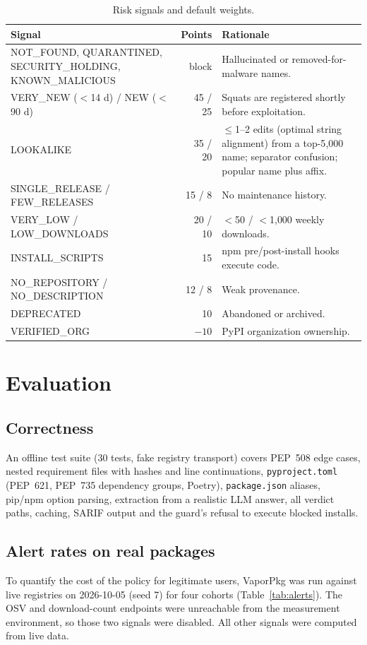 \documentclass[11pt,a4paper]{article}
\begin{document}
\begin{table}[h]
\centering\small
\begin{tabularx}{\linewidth}{@{}>{\raggedright\arraybackslash}p{5.6cm} r >{\raggedright\arraybackslash}X@{}}
\toprule
Signal & Points & Rationale \\ \midrule
NOT\_FOUND, QUARANTINED, SECURITY\_HOLDING, KNOWN\_MALICIOUS & block & Hallucinated or removed-for-malware names. \\
VERY\_NEW ($<$14 d) / NEW ($<$90 d) & 45 / 25 & Squats are registered shortly before exploitation. \\
LOOKALIKE & 35 / 20 & $\leq$1--2 edits (optimal string alignment) from a top-5{,}000 name; separator confusion; popular name plus affix. \\
SINGLE\_RELEASE / FEW\_RELEASES & 15 / 8 & No maintenance history. \\
VERY\_LOW / LOW\_DOWNLOADS & 20 / 10 & $<$50 / $<$1{,}000 weekly downloads. \\
INSTALL\_SCRIPTS & 15 & npm pre/post-install hooks execute code. \\
NO\_REPOSITORY / NO\_DESCRIPTION & 12 / 8 & Weak provenance. \\
DEPRECATED & 10 & Abandoned or archived. \\
VERIFIED\_ORG & $-10$ & PyPI organization ownership. \\ \bottomrule
\end{tabularx}
\caption{Risk signals and default weights.}\label{tab:signals}
\end{table}

\section{Evaluation}
\subsection{Correctness}
An offline test suite (30 tests, fake registry transport) covers PEP~508 edge cases, nested
requirement files with hashes and line continuations, \texttt{pyproject.toml} (PEP~621, PEP~735 dependency
groups, Poetry), \texttt{package.json} aliases, pip/npm option parsing, extraction from a realistic LLM
answer, all verdict paths, caching, SARIF output and the guard's refusal to execute blocked installs.

\subsection{Alert rates on real packages}
To quantify the cost of the policy for legitimate users, VaporPkg was run against live registries on
2026-10-05 (seed 7) for four cohorts (Table~\ref{tab:alerts}). The OSV and download-count endpoints were
unreachable from the measurement environment, so those two signals were disabled. All other signals were
computed from live data.
\end{document}
